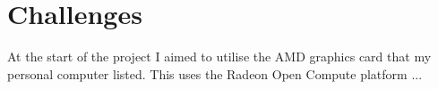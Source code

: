 \section{Challenges}

At the start of the project I aimed to utilise the AMD graphics card that my personal computer listed. This uses the Radeon Open Compute platform ...